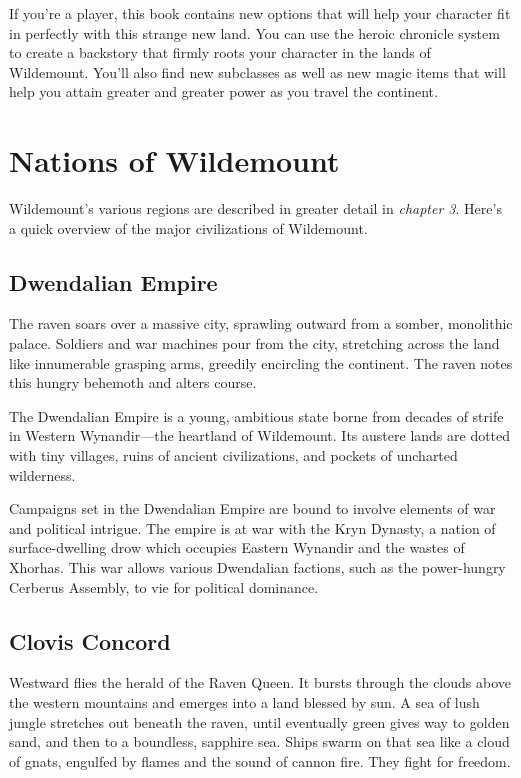 \documentclass[10pt,a4paper,twoside,bg=print,twocolumn,openany,nodeprecatedcode]{dndbook}
\begin{document}
If you're a player, this book contains new options that will help your character fit in perfectly with this strange new land. You can use the heroic chronicle system to create a backstory that firmly roots your character in the lands of Wildemount. You'll also find new subclasses as well as new magic items that will help you attain greater and greater power as you travel the continent.

\section{Nations of Wildemount}
Wildemount's various regions are described in greater detail in \textit{chapter 3}. Here's a quick overview of the major civilizations of Wildemount.

\subsection{Dwendalian Empire}
\begin{DndReadAloud}{}
The raven soars over a massive city, sprawling outward from a somber, monolithic palace. Soldiers and war machines pour from the city, stretching across the land like innumerable grasping arms, greedily encircling the continent. The raven notes this hungry behemoth and alters course.

\end{DndReadAloud}

The Dwendalian Empire is a young, ambitious state borne from decades of strife in Western Wynandir—the heartland of Wildemount. Its austere lands are dotted with tiny villages, ruins of ancient civilizations, and pockets of uncharted wilderness.

Campaigns set in the Dwendalian Empire are bound to involve elements of war and political intrigue. The empire is at war with the Kryn Dynasty, a nation of surface-dwelling drow which occupies Eastern Wynandir and the wastes of Xhorhas. This war allows various Dwendalian factions, such as the power-hungry Cerberus Assembly, to vie for political dominance.

\subsection{Clovis Concord}
\begin{DndReadAloud}{}
Westward flies the herald of the Raven Queen. It bursts through the clouds above the western mountains and emerges into a land blessed by sun. A sea of lush jungle stretches out beneath the raven, until eventually green gives way to golden sand, and then to a boundless, sapphire sea. Ships swarm on that sea like a cloud of gnats, engulfed by flames and the sound of cannon fire. They fight for freedom.

\end{DndReadAloud}
\end{document}
